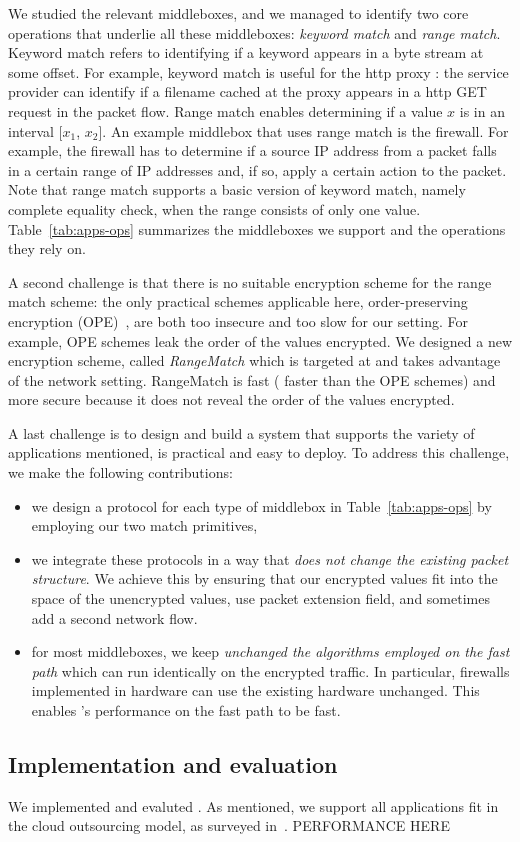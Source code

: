 We studied the relevant middleboxes, and we managed to identify two core operations that underlie all these middleboxes: {\em keyword match} and {\em range match}. Keyword match refers to  identifying if a keyword appears in a byte stream at some offset.   For example, keyword match is useful for the http proxy : the service provider can identify if a filename cached at the proxy appears in a http GET request in the packet flow. %
Range match enables determining if a value $x$ is in an interval [$x_1$, $x_2$]. An example middlebox that uses range match is the firewall.   For example, the firewall has to determine if a source IP address from a packet falls in a certain range of IP addresses and, if so, apply a certain action to the packet.  Note that range match supports a basic version of keyword match, namely complete equality check, when the range consists of only one value.
%
Table~\ref{tab:apps-ops} summarizes the middleboxes we support and the operations they rely on. 


A second challenge is that there is no suitable encryption scheme for the range match scheme:
 the only practical schemes applicable here, order-preserving encryption (OPE)~\cite{boldyreva:ope,popa:mope}, are both too insecure and too slow for our setting.  For example, OPE schemes leak the order of the values encrypted. We designed a new encryption scheme, called {\em RangeMatch} which is targeted at and takes advantage of the network setting. RangeMatch  is fast ( faster than the OPE schemes) and more secure because it does not reveal the order of the values encrypted. 
 
A last challenge is to design and build a system that supports the variety of applications mentioned, is practical and easy to deploy. 
To address this challenge, we make the following contributions:
\begin{itemize}
\item we design a  protocol for each type of middlebox in Table~\ref{tab:apps-ops} by employing our two match  primitives,
\item  we integrate these protocols in a way that {\em does not change the existing packet structure}. We achieve this by ensuring that our encrypted values fit into the space of the unencrypted values, use packet extension field, and sometimes add a second network flow.
\item  for most middleboxes, we keep {\em unchanged  the algorithms employed on the fast path} which can run identically on the encrypted traffic. In particular, firewalls implemented in hardware can use the existing hardware unchanged.  This enables \sys's performance on the fast path to be fast. 
\end{itemize}


\subsection{Implementation and evaluation}

We implemented and evaluted \sys. As mentioned, we support all applications fit in the cloud outsourcing model, as surveyed in~\cite{aplomb}. PERFORMANCE HERE
